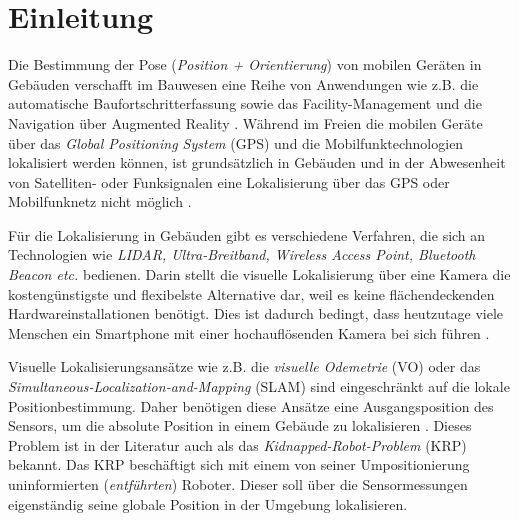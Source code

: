 
\section{Einleitung}
%
%
%
%
%
%
%
%
%
%
%
%
%
%




Die Bestimmung der Pose (\textit{Position + Orientierung}) von mobilen Geräten in Gebäuden verschafft im Bauwesen eine Reihe von Anwendungen wie z.B. die automatische Baufortschritterfassung sowie das Facility-Management und die Navigation über Augmented Reality \cite{kroppModelbasedPoseEstimation2016, kochNaturalMarkersAugmented2014}.
Während im Freien die mobilen Geräte über das \textit{Global Positioning System} (GPS) und die Mobilfunktechnologien lokalisiert werden können, ist grundsätzlich in Gebäuden und in der Abwesenheit von Satelliten- oder Funksignalen eine Lokalisierung über das GPS oder Mobilfunknetz nicht möglich \cite{yassinRecentAdvancesIndoor2016}. 

Für die Lokalisierung in Gebäuden gibt es verschiedene Verfahren, die sich an Technologien wie  \textit{LIDAR, Ultra-Breitband, Wireless Access Point, Bluetooth Beacon etc.} bedienen. Darin stellt die visuelle Lokalisierung über eine Kamera die kostengünstigste und flexibelste Alternative dar, weil es keine flächendeckenden Hardwareinstallationen benötigt. Dies ist dadurch bedingt, dass heutzutage viele Menschen ein Smartphone mit einer hochauflösenden Kamera bei sich führen \cite{wuImagebasedCameraLocalization2018}.

Visuelle Lokalisierungsansätze wie z.B. die 
\textit{visuelle Odemetrie} (VO) oder das \textit{Simultaneous-Localization-and-Mapping} (SLAM) sind eingeschränkt auf die lokale Positionbestimmung. Daher benötigen diese Ansätze eine Ausgangsposition des Sensors, um die absolute Position in einem Gebäude zu lokalisieren \cite{stephenseGlobalLocalizationUsing2002}. Dieses Problem ist in der Literatur auch als das \textit{Kidnapped-Robot-Problem} (KRP) bekannt. Das KRP beschäftigt sich mit einem von seiner Umpositionierung uninformierten (\textit{entführten}) Roboter. Dieser soll über die Sensormessungen eigenständig seine globale Position in der Umgebung lokalisieren.


